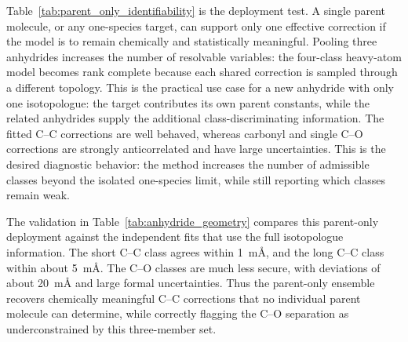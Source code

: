 \documentclass[journal=jpclcd,manuscript=letter]{achemso}
\begin{document}
\begin{table}[H]
\centering
\caption{Identifiability of the parent-only anhydride class-correction problem.  With one parent molecule, only one effective global correction is chemically admissible; separating short C--C, long C--C, carbonyl C--O, and single C--O would be underdetermined.  Pooling three parent molecules makes the four-class model full rank.}
\label{tab:parent_only_identifiability}

\end{table}

\begin{table}[H]
\centering
\caption{Class corrections obtained from the parent-only anhydride ensemble.  Only heavy-atom stretches are fitted.  C--H distances are retained at the BDPCS3 reference values.}
\label{tab:parent_only_classes}

\end{table}

Table~\ref{tab:parent_only_identifiability} is the deployment test.  A single parent molecule, or any one-species target, can support only one effective correction if the model is to remain chemically and statistically meaningful.  Pooling three anhydrides increases the number of resolvable variables: the four-class heavy-atom model becomes rank complete because each shared correction is sampled through a different topology.  This is the practical use case for a new anhydride with only one isotopologue: the target contributes its own parent constants, while the related anhydrides supply the additional class-discriminating information.  The fitted C--C corrections are well behaved, whereas carbonyl and single C--O corrections are strongly anticorrelated and have large uncertainties.  This is the desired diagnostic behavior: the method increases the number of admissible classes beyond the isolated one-species limit, while still reporting which classes remain weak.

\begin{table}[H]
\centering
\caption{Validation of the parent-only anhydride ensemble against ordinary single-molecule refinements using the available isotopologues.  Values are class averages over all matched primitive coordinates.  Stretch differences are reported in m\AA{} in the last column.}
\label{tab:anhydride_geometry}

\end{table}

The validation in Table~\ref{tab:anhydride_geometry} compares this parent-only deployment against the independent fits that use the full isotopologue information.  The short C--C class agrees within 1~m\AA{}, and the long C--C class within about 5~m\AA{}.  The C--O classes are much less secure, with deviations of about 20~m\AA{} and large formal uncertainties.  Thus the parent-only ensemble recovers chemically meaningful C--C corrections that no individual parent molecule can determine, while correctly flagging the C--O separation as underconstrained by this three-member set.
\end{document}
